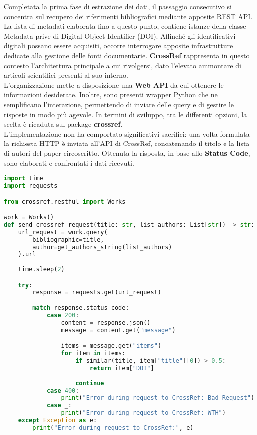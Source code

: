 Completata la prima fase di estrazione dei dati, il passaggio consecutivo si concentra sul recupero dei riferimenti bibliografici mediante apposite REST API. La lista di metadati elaborata fino a questo punto, contiene istanze della classe Metadata prive di Digital Object Identifier (DOI). Affinché gli identificativi digitali possano essere acquisiti, occorre interrogare apposite infrastrutture dedicate alla gestione delle fonti documentarie. \textbf{CrossRef} rappresenta in questo contesto l'architettura principale a cui rivolgersi, dato l'elevato ammontare di articoli scientifici presenti al suo interno. \vspace{7pt} \\
L'organizzazione mette a disposizione una \textbf{Web API} da cui ottenere le informazioni desiderate. Inoltre, sono presenti wrapper Python che ne semplificano l'interazione, permettendo di inviare delle query e di gestire le risposte in modo più agevole. In termini di sviluppo, tra le differenti opzioni, la scelta è ricaduta sul package \textbf{crossref}. \vspace{7pt} \\
L'implementazione non ha comportato significativi sacrifici: una volta formulata la richiesta HTTP è inviata all'API di CrossRef, concatenando il titolo e la lista di autori del paper circoscritto. Ottenuta la risposta, in base allo \textbf{Status Code}, sono elaborati e confrontati i dati ricevuti.
\begin{lstlisting}[language=python, caption=Recupero di riferimenti bibliografici tramite CrossRef]
import time
import requests

from crossref.restful import Works

work = Works()
def send_crossref_request(title: str, list_authors: List[str]) -> str:
    url_request = work.query(
        bibliographic=title,
        author=get_authors_string(list_authors)
    ).url
    
    time.sleep(2)

    try:
        response = requests.get(url_request)

        match response.status_code:
            case 200:
                content = response.json()
                message = content.get("message")

                items = message.get("items")
                for item in items:
                    if similar(title, item["title"][0]) > 0.5:
                        return item["DOI"]
                                                                
                    continue
            case 400:
                print("Error during request to CrossRef: Bad Request")
            case _:
                print("Error during request to CrossRef: WTH")
    except Exception as e:
        print("Error during request to CrossRef:", e)\end{lstlisting}
